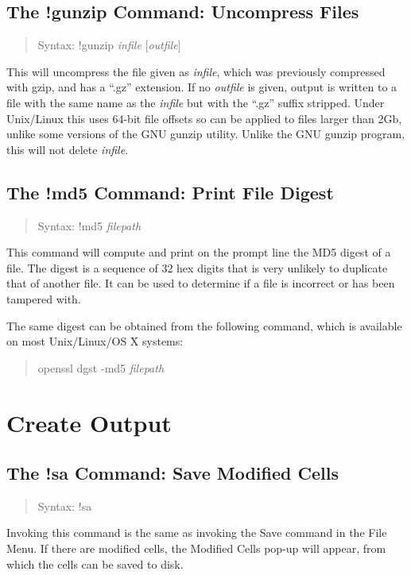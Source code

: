 \subsection{The {\cb !gunzip} Command: Uncompress Files}
\begin{quote}
Syntax: {\vt !gunzip} {\it infile} [{\it outfile\/}]
\end{quote}
This will uncompress the file given as {\it infile}, which was
previously compressed with {\vt gzip}, and has a ``{\vt .gz}''
extension.  If no {\it outfile} is given, output is written to a file
with the same name as the {\it infile} but with the ``{\vt .gz}''
suffix stripped.  Under Unix/Linux this uses 64-bit file offsets so
can be applied to files larger than 2Gb, unlike some versions of the
GNU {\vt gunzip} utility.  Unlike the GNU {\vt gunzip} program, this
will not delete {\it infile\/}.

\subsection{The {\cb !md5} Command: Print File Digest}
\begin{quote}
Syntax: {\vt !md5} {\it filepath}
\end{quote}
This command will compute and print on the prompt line the MD5 digest
of a file.  The digest is a sequence of 32 hex digits that is very
unlikely to duplicate that of another file.  It can be used to
determine if a file is incorrect or has been tampered with.

The same digest can be obtained from the following command, which is
available on most Unix/Linux/OS X systems:
\begin{quote}
{\vt openssl dgst -md5} {\it filepath}
\end{quote}

\section{Create Output}

\subsection{The {\cb !sa} Command: Save Modified Cells}
\begin{quote}
Syntax: {\vt !sa}
\end{quote}
Invoking this command is the same as invoking the {\cb Save} command
in the {\cb File Menu}.  If there are modified cells, the {\cb
Modified Cells} pop-up will appear, from which the cells can be saved
to disk.

